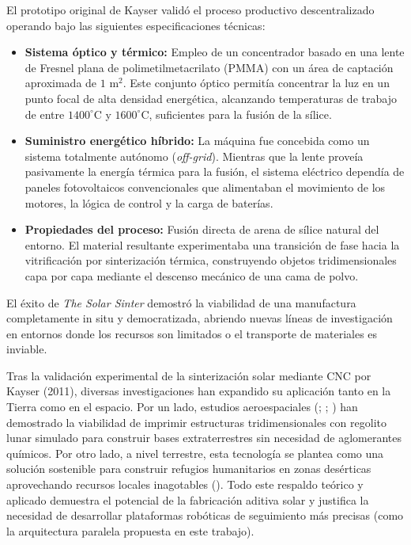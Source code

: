 El prototipo original de Kayser validó el proceso productivo descentralizado operando bajo las siguientes especificaciones técnicas:

\begin{itemize}
    \item \textbf{Sistema óptico y térmico:} Empleo de un concentrador basado en una lente de Fresnel plana de polimetilmetacrilato (\gls{PMMA}) con un área de captación aproximada de $1\text{ m}^2$. Este conjunto óptico permitía concentrar la luz en un punto focal de alta densidad energética, alcanzando temperaturas de trabajo de entre $1400^\circ\text{C}$ y $1600^\circ\text{C}$, suficientes para la fusión de la sílice.
    \item \textbf{Suministro energético híbrido:} La máquina fue concebida como un sistema totalmente autónomo (\textit{off-grid}). Mientras que la lente proveía pasivamente la energía térmica para la fusión, el sistema eléctrico dependía de paneles fotovoltaicos convencionales que alimentaban el movimiento de los motores, la lógica de control y la carga de baterías.
    \item \textbf{Propiedades del proceso:} Fusión directa de arena de sílice natural del entorno. El material resultante experimentaba una transición de fase hacia la vitrificación por sinterización térmica, construyendo objetos tridimensionales capa por capa mediante el descenso mecánico de una cama de polvo.
\end{itemize}

El éxito de \textit{The Solar Sinter} demostró la viabilidad de una manufactura completamente in situ y democratizada, abriendo nuevas líneas de investigación en entornos donde los recursos son limitados o el transporte de materiales es inviable. 

Tras la validación experimental de la sinterización solar mediante CNC por Kayser (2011)\cite{kayser2011}, diversas investigaciones han expandido su aplicación tanto en la Tierra como en el espacio. Por un lado, estudios aeroespaciales (\cite{Hoheneder2017AdvancingSS}; \cite{MEURISSE2018800}; \cite{Fateri2019}) han demostrado la viabilidad de imprimir estructuras tridimensionales con regolito lunar simulado para construir bases extraterrestres sin necesidad de aglomerantes químicos. Por otro lado, a nivel terrestre, esta tecnología se plantea como una solución sostenible para construir refugios humanitarios en zonas desérticas aprovechando recursos locales inagotables (\cite{su16062294}). Todo este respaldo teórico y aplicado demuestra el potencial de la fabricación aditiva solar y justifica la necesidad de desarrollar plataformas robóticas de seguimiento más precisas (como la arquitectura paralela propuesta en este trabajo).
